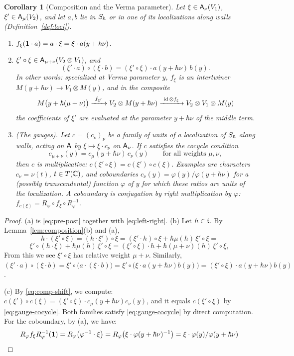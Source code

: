 \documentclass{article}
\theoremstyle{plain}
\newtheorem{corollary}[theorem]{Corollary}
\theoremstyle{definition}
\theoremstyle{remark}
\numberwithin{equation}{section}
\begin{document}
\begin{corollary}[Composition and the Verma parameter]\label{cor:comp-verma}
Let $\xi\in\mathsf A_\nu(V_1)$, $\xi'\in\mathsf A_\mu(V_2)$, and let $a,b$ lie in $S_\hbar$ or in one of its localizations along walls (Definition~\ref{def:loci}).
\begin{enumerate}[label=(\alph*)]
\item $f_\xi(\mathbf 1\cdot a)=a\cdot\xi=\xi\cdot a(y+\hbar\nu)$.
\item $\xi'\circ\xi\in\mathsf A_{\mu+\nu}(V_2\otimes V_1)$, and
\begin{equation}\label{eq:comp-shift}
(\xi'\cdot a)\circ(\xi\cdot b)=(\xi'\circ\xi)\cdot a(y+\hbar\nu)\,b(y).
\end{equation}
In other words: specialized at Verma parameter $y$, $f_\xi$ is an intertwiner $M(y+\hbar\nu)\to V_1\otimes M(y)$, and in the composite
\[
M\bigl(y+\hbar(\mu+\nu)\bigr)\xrightarrow{\ f_{\xi'}\ }V_2\otimes M(y+\hbar\nu)\xrightarrow{\ \id\otimes f_\xi\ }V_2\otimes V_1\otimes M(y)
\]
the coefficients of $\xi'$ are evaluated at the parameter $y+\hbar\nu$ of the middle term.
\item (The gauges). Let $c=(c_\nu)_\nu$ be a family of units of a localization of $S_\hbar$ along walls, acting on $\mathsf A$ by $\xi\mapsto\xi\cdot c_\nu$ on $\mathsf A_\nu$. If $c$ satisfies the cocycle condition
\begin{equation}\label{eq:gauge-cocycle}
c_{\mu+\nu}(y)=c_\mu(y+\hbar\nu)\,c_\nu(y)\qquad\text{for all weights }\mu,\nu,
\end{equation}
then $c$ is multiplicative: $c(\xi'\circ\xi)=c(\xi')\circ c(\xi)$. Examples are characters $c_\nu=\nu(t)$, $t\in T(\mathbb{C})$, and coboundaries $c_\nu(y)=\varphi(y)/\varphi(y+\hbar\nu)$ for a (possibly transcendental) function $\varphi$ of $y$ for which these ratios are units of the localization. A coboundary is conjugation by right multiplication by $\varphi$: $f_{c(\xi)}=R_\varphi\circ f_\xi\circ R_\varphi^{-1}$.
\end{enumerate}
\end{corollary}

\begin{proof}
(a) is \eqref{eq:pre-post} together with \eqref{eq:left-right}. (b) Let $h\in\mathfrak{t}$. By Lemma~\ref{lem:composition}(b) and (a),
\[
h\cdot(\xi'\circ\xi)=(h\cdot\xi')\circ\xi=(\xi'\cdot h)\circ\xi+\hbar\mu(h)\,\xi'\circ\xi=
\]
\[
\xi'\circ(h\cdot\xi)+\hbar\mu(h)\,\xi'\circ\xi=(\xi'\circ\xi)\cdot h+\hbar(\mu+\nu)(h)\,\xi'\circ\xi ,
\]
From this we see $\xi'\circ\xi$ has relative weight $\mu+\nu$. Similarly, $(\xi'\cdot a)\circ(\xi\cdot b)=\xi'\circ\bigl(a\cdot(\xi\cdot b)\bigr)=\xi'\circ\bigl(\xi\cdot a(y+\hbar\nu)b(y)\bigr)=(\xi'\circ\xi)\cdot a(y+\hbar\nu)b(y)$. 

(c) By \eqref{eq:comp-shift}, we compute: $c(\xi')\circ c(\xi)=(\xi'\circ\xi)\cdot c_\mu(y+\hbar\nu)c_\nu(y)$, and it equals $c(\xi'\circ\xi)$ by \eqref{eq:gauge-cocycle}. Both families satisfy \eqref{eq:gauge-cocycle} by direct computation. For the coboundary, by (a), we have:
\[
R_\varphi f_\xi R_\varphi^{-1}(\mathbf 1)=R_\varphi\bigl(\varphi^{-1}\cdot\xi\bigr)=R_\varphi\bigl(\xi\cdot\varphi(y+\hbar\nu)^{-1}\bigr)=\xi\cdot\varphi(y)/\varphi(y+\hbar\nu)
\]\end{proof}
\end{document}
